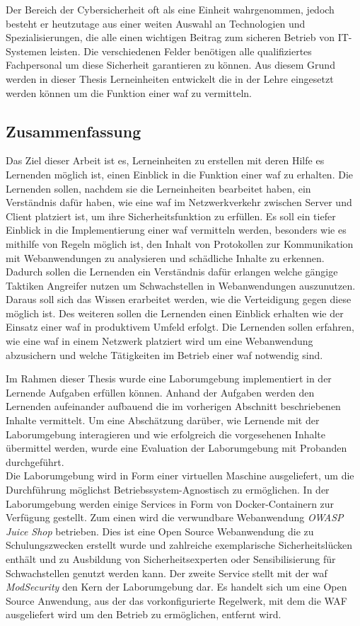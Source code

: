 Der Bereich der Cybersicherheit oft als eine Einheit wahrgenommen, jedoch besteht er heutzutage aus einer weiten Auswahl an Technologien und Spezialisierungen, die alle einen wichtigen Beitrag zum sicheren Betrieb von IT-Systemen leisten.
Die verschiedenen Felder benötigen alle qualifiziertes Fachpersonal um diese Sicherheit garantieren zu können.
Aus diesem Grund werden in dieser Thesis Lerneinheiten entwickelt die in der Lehre eingesetzt werden können um die Funktion einer \ac{waf} zu vermitteln.

\subsection{Zusammenfassung}
Das Ziel dieser Arbeit ist es, Lerneinheiten zu erstellen mit deren Hilfe es Lernenden möglich ist, einen Einblick in die Funktion einer \ac{waf} zu erhalten.
Die Lernenden sollen, nachdem sie die Lerneinheiten bearbeitet haben, ein Verständnis dafür haben, wie eine \ac{waf} im Netzwerkverkehr zwischen Server und Client platziert ist, um ihre Sicherheitsfunktion zu erfüllen.
Es soll ein tiefer Einblick in die Implementierung einer \ac{waf} vermitteln werden, besonders wie es mithilfe von Regeln möglich ist, den Inhalt von Protokollen zur Kommunikation mit Webanwendungen zu analysieren und schädliche Inhalte zu erkennen.
Dadurch sollen die Lernenden ein Verständnis dafür erlangen welche gängige Taktiken Angreifer nutzen um Schwachstellen in Webanwendungen auszunutzen.
Daraus soll sich das Wissen erarbeitet werden, wie die Verteidigung gegen diese möglich ist.
Des weiteren sollen die Lernenden einen Einblick erhalten wie der Einsatz einer \ac{waf} in produktivem Umfeld erfolgt.
Die Lernenden sollen erfahren, wie eine \ac{waf} in einem Netzwerk platziert wird um eine Webanwendung abzusichern und welche Tätigkeiten im Betrieb einer \ac{waf} notwendig sind.

Im Rahmen dieser Thesis wurde eine Laborumgebung implementiert in der Lernende Aufgaben erfüllen können.
Anhand der Aufgaben werden den Lernenden aufeinander aufbauend die im vorherigen Abschnitt beschriebenen Inhalte vermittelt.
Um eine Abschätzung darüber, wie Lernende mit der Laborumgebung interagieren und wie erfolgreich die vorgesehenen Inhalte übermittel werden, wurde eine Evaluation der Laborumgebung mit Probanden durchgeführt.\\

Die Laborumgebung wird in Form einer virtuellen Maschine ausgeliefert, um die Durchführung möglichst Betriebssystem-Agnostisch zu ermöglichen.
In der Laborumgebung werden einige Services in Form von Docker-Containern zur Verfügung gestellt.
Zum einen wird die verwundbare Webanwendung \textit{OWASP Juice Shop} betrieben.
Dies ist eine Open Source Webanwendung die zu Schulungszwecken erstellt wurde und zahlreiche exemplarische Sicherheitslücken enthält und zu Ausbildung von Sicherheitsexperten oder Sensibilisierung für Schwachstellen genutzt werden kann.
Der zweite Service stellt mit der \ac{waf} \textit{ModSecurity} den Kern der Laborumgebung dar.
Es handelt sich um eine Open Source Anwendung, aus der das vorkonfigurierte Regelwerk, mit dem die WAF ausgeliefert wird um den Betrieb zu ermöglichen, entfernt wird.\\

